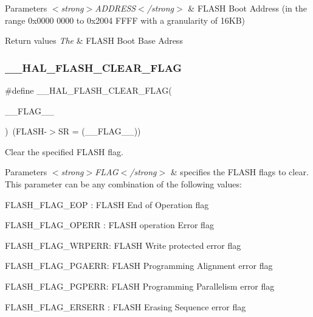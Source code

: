 \begin{DoxyParams}{Parameters}
{\em $<$strong$>$\+A\+D\+D\+R\+E\+S\+S$<$/strong$>$} & F\+L\+A\+SH Boot Address (in the range 0x0000 0000 to 0x2004 F\+F\+FF with a granularity of 16KB) \\
\hline
\end{DoxyParams}

\begin{DoxyRetVals}{Return values}
{\em The} & F\+L\+A\+SH Boot Base Adress \\
\hline
\end{DoxyRetVals}
\mbox{\label{group___f_l_a_s_h___exported___macros_ga68e49c4675761e2ec35153e747de7622}} 
\subsubsection{\texorpdfstring{\_\_HAL\_FLASH\_CLEAR\_FLAG}{\_\_HAL\_FLASH\_CLEAR\_FLAG}}
{\footnotesize\ttfamily \#define \+\_\+\+\_\+\+H\+A\+L\+\_\+\+F\+L\+A\+S\+H\+\_\+\+C\+L\+E\+A\+R\+\_\+\+F\+L\+AG(\begin{DoxyParamCaption}\item[{}]{\+\_\+\+\_\+\+F\+L\+A\+G\+\_\+\+\_\+ }\end{DoxyParamCaption})~(F\+L\+A\+SH-\/$>$SR = (\+\_\+\+\_\+\+F\+L\+A\+G\+\_\+\+\_\+))}



Clear the specified F\+L\+A\+SH flag. 


\begin{DoxyParams}{Parameters}
{\em $<$strong$>$\+F\+L\+A\+G$<$/strong$>$} & specifies the F\+L\+A\+SH flags to clear. This parameter can be any combination of the following values\+: \begin{DoxyItemize}
\item F\+L\+A\+S\+H\+\_\+\+F\+L\+A\+G\+\_\+\+E\+OP \+: F\+L\+A\+SH End of Operation flag \item F\+L\+A\+S\+H\+\_\+\+F\+L\+A\+G\+\_\+\+O\+P\+E\+RR \+: F\+L\+A\+SH operation Error flag \item F\+L\+A\+S\+H\+\_\+\+F\+L\+A\+G\+\_\+\+W\+R\+P\+E\+RR\+: F\+L\+A\+SH Write protected error flag \item F\+L\+A\+S\+H\+\_\+\+F\+L\+A\+G\+\_\+\+P\+G\+A\+E\+RR\+: F\+L\+A\+SH Programming Alignment error flag \item F\+L\+A\+S\+H\+\_\+\+F\+L\+A\+G\+\_\+\+P\+G\+P\+E\+RR\+: F\+L\+A\+SH Programming Parallelism error flag \item F\+L\+A\+S\+H\+\_\+\+F\+L\+A\+G\+\_\+\+E\+R\+S\+E\+RR \+: F\+L\+A\+SH Erasing Sequence error flag \end{DoxyItemize}
\\
\hline
\end{DoxyParams}

